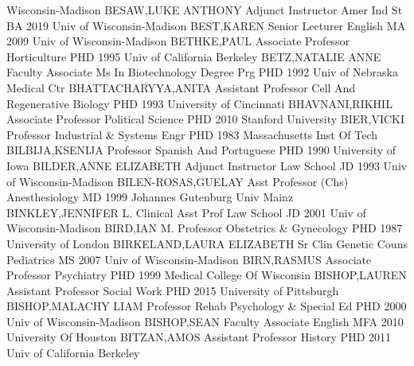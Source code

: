 \documentclass[
]{article}
\begin{document}
Wisconsin-Madison \textbar BESAW,LUKE ANTHONY \textbar{} 
\textbar Adjunct Instructor \textbar Amer Ind St \textbar BA 2019 Univ
of Wisconsin-Madison \textbar BEST,KAREN \textbar{} 
\textbar Senior Lecturer \textbar English \textbar MA 2009 Univ of
Wisconsin-Madison \textbar BETHKE,PAUL \textbar{} 
\textbar Associate Professor \textbar Horticulture \textbar PHD 1995
Univ of California Berkeley \textbar BETZ,NATALIE ANNE \textbar{}
 \textbar Faculty Associate \textbar Ms In Biotechnology
Degree Prg \textbar PHD 1992 Univ of Nebraska Medical Ctr
\textbar BHATTACHARYYA,ANITA \textbar{}  \textbar Assistant
Professor \textbar Cell And Regenerative Biology \textbar PHD 1993
University of Cincinnati \textbar BHAVNANI,RIKHIL \textbar{} 
\textbar Associate Professor \textbar Political Science \textbar PHD
2010 Stanford University \textbar BIER,VICKI \textbar{} 
\textbar Professor \textbar Industrial \& Systems Engr \textbar PHD 1983
Massachusetts Inst Of Tech \textbar BILBIJA,KSENIJA \textbar{}
 \textbar Professor \textbar Spanish And Portuguese
\textbar PHD 1990 University of Iowa \textbar BILDER,ANNE ELIZABETH
\textbar{}  \textbar Adjunct Instructor \textbar Law School
\textbar JD 1993 Univ of Wisconsin-Madison \textbar BILEN-ROSAS,GUELAY
\textbar{}  \textbar Asst Professor (Chs)
\textbar Anesthesiology \textbar MD 1999 Johannes Gutenburg Univ Mainz
\textbar BINKLEY,JENNIFER L. \textbar{}  \textbar Clinical
Asst Prof \textbar Law School \textbar JD 2001 Univ of Wisconsin-Madison
\textbar BIRD,IAN M. \textbar{}  \textbar Professor
\textbar Obstetrics \& Gynecology \textbar PHD 1987 University of London
\textbar BIRKELAND,LAURA ELIZABETH \textbar{}  \textbar Sr
Clin Genetic Couns \textbar Pediatrics \textbar MS 2007 Univ of
Wisconsin-Madison \textbar BIRN,RASMUS \textbar{} 
\textbar Associate Professor \textbar Psychiatry \textbar PHD 1999
Medical College Of Wisconsin \textbar BISHOP,LAUREN \textbar{}
 \textbar Assistant Professor \textbar Social Work
\textbar PHD 2015 University of Pittsburgh \textbar BISHOP,MALACHY LIAM
\textbar{}  \textbar Professor \textbar Rehab Psychology \&
Special Ed \textbar PHD 2000 Univ of Wisconsin-Madison
\textbar BISHOP,SEAN \textbar{}  \textbar Faculty Associate
\textbar English \textbar MFA 2010 University Of Houston
\textbar BITZAN,AMOS \textbar{}  \textbar Assistant Professor
\textbar History \textbar PHD 2011 Univ of California Berkeley
\end{document}
